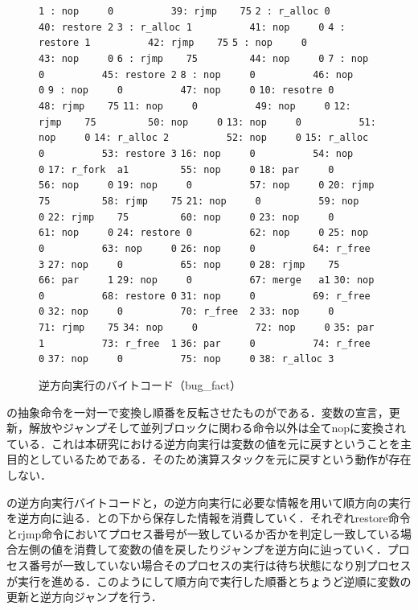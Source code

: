 \documentclass[submit,PRO]{ipsj}
\def\|{\verb|}
\begin{document}
\begin{figure}[tb]
\vbox{
\hbox{\|1 : nop     0          39: rjmp    75|}
\hbox{\|2 : r_alloc 0          40: restore 2|}
\hbox{\|3 : r_alloc 1          41: nop     0|}
\hbox{\|4 : restore 1          42: rjmp    75|}
\hbox{\|5 : nop     0          43: nop     0|}
\hbox{\|6 : rjmp    75         44: nop     0|}
\hbox{\|7 : nop     0          45: restore 2|}
\hbox{\|8 : nop     0          46: nop     0|}
\hbox{\|9 : nop     0          47: nop     0|}
\hbox{\|10: resotre 0          48: rjmp    75|}
\hbox{\|11: nop     0          49: nop     0|}
\hbox{\|12: rjmp    75         50: nop     0|}
\hbox{\|13: nop     0          51: nop     0|}
\hbox{\|14: r_alloc 2          52: nop     0|}
\hbox{\|15: r_alloc 0          53: restore 3|}
\hbox{\|16: nop     0          54: nop     0|}
\hbox{\|17: r_fork  a1         55: nop     0|}
\hbox{\|18: par     0          56: nop     0|}
\hbox{\|19: nop     0          57: nop     0|}
\hbox{\|20: rjmp    75         58: rjmp    75|}
\hbox{\|21: nop     0          59: nop     0|}
\hbox{\|22: rjmp    75         60: nop     0|}
\hbox{\|23: nop     0          61: nop     0|}
\hbox{\|24: restore 0          62: nop     0|}
\hbox{\|25: nop     0          63: nop     0|}
\hbox{\|26: nop     0          64: r_free  3|}
\hbox{\|27: nop     0          65: nop     0|}
\hbox{\|28: rjmp    75         66: par     1|}
\hbox{\|29: nop     0          67: merge   a1|}
\hbox{\|30: nop     0          68: restore 0|}
\hbox{\|31: nop     0          69: r_free  0|}
\hbox{\|32: nop     0          70: r_free  2|}
\hbox{\|33: nop     0          71: rjmp    75|}
\hbox{\|34: nop     0          72: nop     0|}
\hbox{\|35: par     1          73: r_free  1|}
\hbox{\|36: par     0          74: r_free  0|}
\hbox{\|37: nop     0          75: nop     0|}
\hbox{\|38: r_alloc 3         |}
}
\centerline{}
\caption{逆方向実行のバイトコード（bug\_fact）}
\label{fig:backwardfact}
\end{figure}



の抽象命令を一対一で変換し順番を反転させたものがである．変数の宣言，更新，解放やジャンプそして並列ブロックに関わる命令以外は全てnopに変換されている．これは本研究における逆方向実行は変数の値を元に戻すということを主目的としているためである．そのため演算スタックを元に戻すという動作が存在しない．

の逆方向実行バイトコードと，の逆方向実行に必要な情報を用いて順方向の実行を逆方向に辿る．との下から保存した情報を消費していく．それぞれrestore命令とrjmp命令においてプロセス番号が一致しているか否かを判定し一致している場合左側の値を消費して変数の値を戻したりジャンプを逆方向に辿っていく．プロセス番号が一致していない場合そのプロセスの実行は待ち状態になり別プロセスが実行を進める．このようにして順方向で実行した順番とちょうど逆順に変数の更新と逆方向ジャンプを行う．
\end{document}
